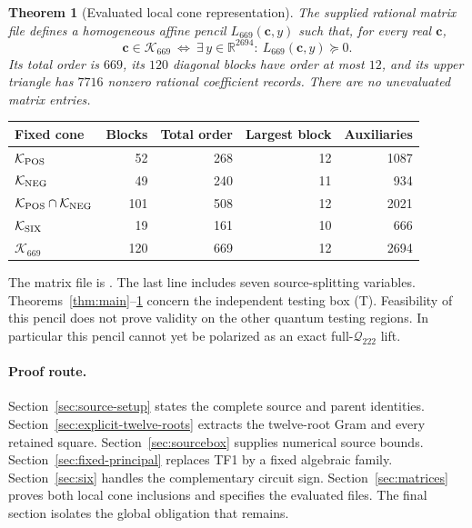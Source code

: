 \documentclass[10pt,a4paper]{article}
\newtheorem{theorem}{Theorem}
\newcommand{\R}{\mathbb R}
\newcommand{\cone}{\mathcal K}
\begin{document}
\begin{theorem}[Evaluated local cone representation]\label{thm:pencil}
The supplied rational matrix file defines a homogeneous
affine pencil $L_{669}(\mathbf c,y)$ such that, for every real
$\mathbf c$,
\[
 \boxed{\quad
 \mathbf c\in\cone_{669}\ \Longleftrightarrow\
 \exists\,y\in\R^{2694}:\ L_{669}(\mathbf c,y)\succeq0.
 \quad}
\]
Its total order is $669$, its $120$ diagonal blocks have order at
most $12$, and its upper triangle has $7716$ nonzero rational
coefficient records. There are no unevaluated matrix entries.
\end{theorem}

\begin{center}
\begin{tabular}{lrrrr}
\toprule
Fixed cone & Blocks & Total order & Largest block & Auxiliaries\\
\midrule
$\cone_{\rm POS}$ &52&268&12&1087\\
$\cone_{\rm NEG}$ &49&240&11&934\\
$\cone_{\rm POS}\cap\cone_{\rm NEG}$ &101&508&12&2021\\
$\cone_{\rm SIX}$ &19&161&10&666\\
$\cone_{669}$ &120&669&12&2694\\
\bottomrule
\end{tabular}
\end{center}
The matrix file is .
The last line includes seven source-splitting variables.
Theorems~\ref{thm:main}--\ref{thm:pencil} concern the independent
testing box (T). Feasibility of this pencil does not prove validity
on the other quantum testing regions. In particular this pencil
cannot yet be polarized as an exact full-$\mathcal Q_{222}$ lift.

\paragraph{Proof route.}
Section~\ref{sec:source-setup} states the complete source and parent
identities. Section~\ref{sec:explicit-twelve-roots} extracts the
twelve-root Gram and every retained square.
Section~\ref{sec:sourcebox} supplies numerical source bounds.
Section~\ref{sec:fixed-principal} replaces TF1 by a fixed algebraic
family. Section~\ref{sec:six} handles the complementary circuit
sign. Section~\ref{sec:matrices} proves both local cone inclusions
and specifies the evaluated files. The final section isolates the
global obligation that remains.







\end{document}
